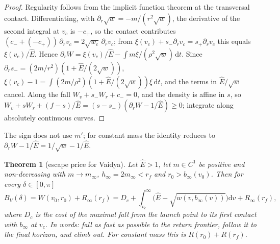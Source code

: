 \documentclass[aip,jmp,amsmath,amssymb,reprint]{revtex4-2}
\newcommand{\Ehat}{\hat E}
\newcommand{\dd}{\mathrm{d}}
\theoremstyle{plain}
\newtheorem{theorem}{Theorem}
\theoremstyle{definition}
\begin{document}
\begin{proof}
Regularity follows from the implicit function theorem at the transversal contact. Differentiating,
with $\partial_r\sqrt w=-m/(r^2\sqrt w)$, the derivative of the second integral at $v_c$ is $-c_+$, so the
contact contributes $(c_-+(-c_+))\,\partial_rv_c=2\sqrt{w_c}\,\partial_rv_c$; from
$\xi(v_c)+s_-\partial_rv_c=s_+\partial_rv_c$ this equals $\xi(v_c)/\Ehat$. Hence
$\partial_rW=\xi(v_c)/\Ehat-\int m\xi/(\rho^2\sqrt w)\,\dd t$. Since $\partial_rs_-=(2m/r^2)(1+\Ehat/(2\sqrt w))$,
$\xi(v_c)-1=\int(2m/\rho^2)(1+\Ehat/(2\sqrt w))\xi\,\dd t$, and the terms in $\Ehat/\sqrt w$ cancel. Along the
fall $W_v+s_-W_r+c_-=0$, and the density is affine in $s$, so
$W_v+sW_r+(f-s)/\Ehat=(s-s_-)(\partial_rW-1/\Ehat)\ge0$; integrate along absolutely continuous curves.
\end{proof}

The sign does not use $m'$; for constant mass the identity reduces to
$\partial_rW-1/\Ehat=1/\sqrt w-1/\Ehat$.

\begin{theorem}[escape price for Vaidya]\label{thm:vaidya-escape}
Let $\Ehat>1$, let $m\in C^1$ be positive and non-decreasing with $m\to m_\infty$, $h_\infty=2m_\infty<r_f$
and $r_0>b_\infty(v_0)$. Then for every $\delta\in[0,\pi]$
\[
  B_V(\delta)=W(v_0,r_0)+R_\infty(r_f)
  =D_c+\int_{v_c}^\infty\big(\Ehat-\sqrt{w(v,b_\infty(v))}\big)\dd v+R_\infty(r_f),
\]
where $D_c$ is the cost of the maximal fall from the launch point to its first contact with
$b_\infty$ at $v_c$. In words: fall as fast as possible to the return frontier, follow it to
the final horizon, and climb out. For constant mass this is $R(r_0)+R(r_f)$.
\end{theorem}
\end{document}

